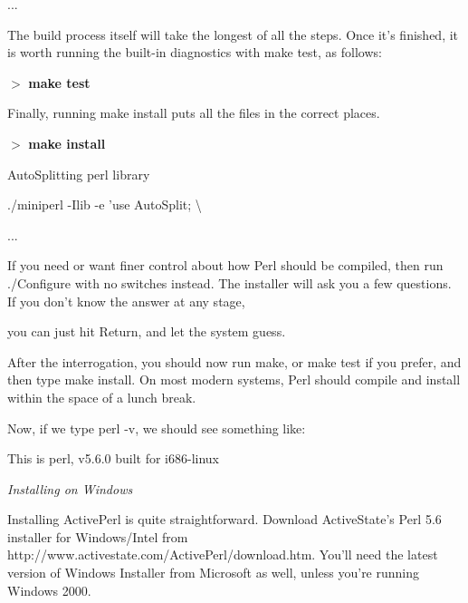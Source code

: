 \documentclass[a4paper,11pt]{book}
\begin{document}
\noindent 

\noindent ...

\noindent 

\noindent The build process itself will take the longest of all the steps. Once it's finished, it is worth running the built-in diagnostics with make test, as follows:

\noindent 

\noindent $>$ \textbf{make test}

\noindent 

\noindent Finally, running make install puts all the files in the correct places.

\noindent 

\noindent $>$ \textbf{make install}

\noindent AutoSplitting perl library

\noindent ./miniperl -Ilib -e 'use AutoSplit; \textbackslash 

\noindent 

\noindent ...

\noindent 

\noindent If you need or want finer control about how Perl should be compiled, then run ./Configure with no switches instead. The installer will ask you a few questions. If you don't know the answer at any stage,

\noindent you can just hit Return, and let the system guess.

\noindent 

\noindent After the interrogation, you should now run make, or make test if you prefer, and then type make install. On most modern systems, Perl should compile and install within the space of a lunch break.

\noindent 

\noindent Now, if we type perl -v, we should see something like:

\noindent 

\noindent This is perl, v5.6.0 built for i686-linux

\noindent 

\noindent \textit{Installing on Windows}

\noindent Installing ActivePerl is quite straightforward. Download ActiveState's Perl 5.6 installer for Windows/Intel from http://www.activestate.com/ActivePerl/download.htm. You'll need the latest version of Windows Installer from Microsoft as well, unless you're running Windows 2000.

\noindent 
\end{document}
